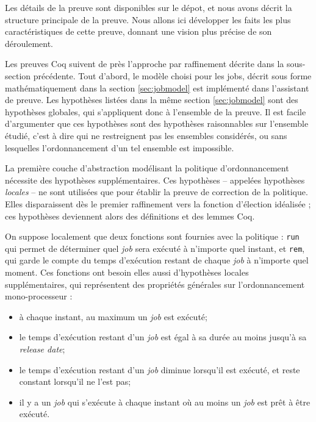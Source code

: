 	Les détails de la preuve sont disponibles sur le dépot, et nous avons décrit la structure principale de la preuve. Nous allons ici développer les faits les plus caractéristiques de cette preuve, donnant une vision plus précise de son déroulement. 

	Les preuves Coq suivent de près l'approche par raffinement décrite dans la sous-section précédente. Tout d'abord, le modèle choisi pour les jobs, décrit sous forme mathématiquement dans la section \ref{sec:jobmodel} est implémenté dans l'assistant de preuve. Les hypothèses listées dans la même section \ref{sec:jobmodel} sont des hypothèses globales, qui s'appliquent donc à l'ensemble de la preuve. Il est facile d'argumenter que ces hypothèses sont des hypothèses raisonnables sur l'ensemble étudié, c'est à dire qui ne restreignent pas les ensembles considérés, ou sans lesquelles l'ordonnancement d'un tel ensemble est impossible.

	La première couche d'abstraction modélisant la politique d'ordonnancement nécessite des hypothèses supplémentaires. Ces hypothèses -- appelées hypothèses \emph{locales} -- ne sont utilisées que pour établir la preuve de correction de la politique. Elles disparaissent dès le premier raffinement vers la fonction d'élection idéalisée ; ces hypothèses deviennent alors des définitions et des lemmes Coq.

	On suppose localement que deux fonctions sont fournies avec la politique : \texttt{run} qui permet de déterminer quel \emph{job} sera exécuté à n'importe quel instant, et \texttt{rem}, qui garde le compte du temps d'exécution restant de chaque \emph{job} à n'importe quel moment.
	Ces fonctions ont besoin elles aussi d'hypothèses locales supplémentaires, qui représentent des propriétés générales sur l'ordonnancement mono-processeur :
	
	\begin{itemize}
		\item à chaque instant, au maximum un \emph{job} est exécuté;
		\item le temps d'exécution restant d'un \emph{job} est égal à sa durée au moins jusqu'à sa \emph{release date};
		\item le temps d'exécution restant d'un \emph{job} diminue lorsqu'il est exécuté, et reste constant lorsqu'il ne l'est pas;
		\item il y a un \emph{job} qui s'exécute à chaque instant où au moins un \emph{job} est prêt à être exécuté.
	\end{itemize}

